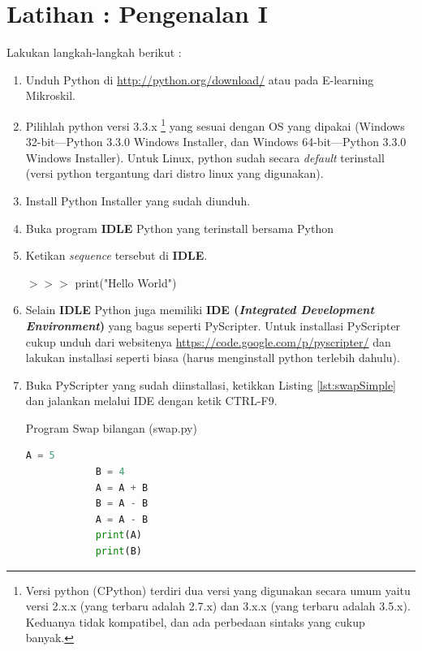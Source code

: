 \section{Latihan : Pengenalan I}

\begin{pemrograman}
Lakukan langkah-langkah berikut :
\begin{enumerate}
	\item Unduh Python di \url{http://python.org/download/} atau pada E-learning Mikroskil.
	\item Pilihlah python versi 3.3.x \footnote{Versi python (CPython) terdiri dua versi yang digunakan secara umum yaitu versi 2.x.x (yang terbaru adalah 2.7.x) dan 3.x.x (yang terbaru adalah 3.5.x). Keduanya tidak kompatibel, dan ada perbedaan sintaks yang cukup banyak.} yang sesuai dengan OS yang dipakai (Windows 32-bit---Python 3.3.0 Windows Installer, dan Windows 64-bit---Python 3.3.0 Windows Installer). Untuk Linux, python sudah secara \textit{default} terinstall (versi python tergantung dari distro linux yang digunakan).
	\item Install Python Installer yang sudah diunduh.
	\item Buka program \textbf{IDLE} Python yang terinstall bersama Python	
	\item Ketikan \textit{sequence} tersebut di \textbf{IDLE}.
	\begin{IDLE}
	\begin{tabbing}
	$>>>$ print("Hello World")
	\end{tabbing}
	\end{IDLE}
	\item Selain \textbf{IDLE} Python juga memiliki \textbf{IDE (\textit{Integrated Development Environment})} yang bagus seperti PyScripter. Untuk installasi PyScripter cukup unduh dari websitenya \url{https://code.google.com/p/pyscripter/} dan lakukan installasi seperti biasa (harus menginstall python terlebih dahulu).
	\item Buka PyScripter yang sudah diinstallasi, ketikkan Listing \ref{lst:swapSimple} dan jalankan melalui IDE  dengan ketik CTRL-F9.
		\begin{listprog}{Program Swap bilangan (swap.py)}
		\label{lst:swapSimple}
		\begin{lstlisting}[language=Python]
			A = 5
			B = 4
			A = A + B
			B = A - B
			A = A - B
			print(A)
			print(B)
		\end{lstlisting}
\end{listprog}
\end{enumerate}
\end{pemrograman}

